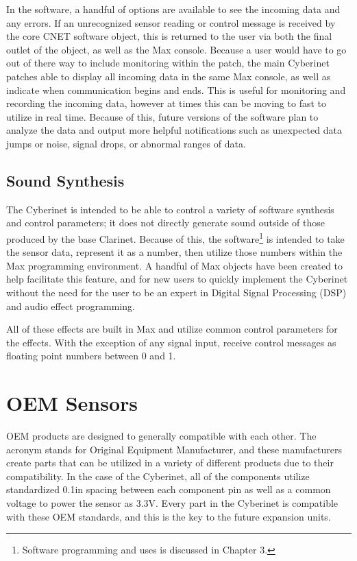 In the software, a handful of options are available to see the incoming data and any errors. If an unrecognized sensor reading or control message is received by the core CNET software object, this is returned to the user via both the final outlet of the object, as well as the Max console. Because a user would have to go out of there way to include monitoring within the patch, the main Cyberinet patches able to display all incoming data in the same Max console, as well as indicate when communication begins and ends. This is useful for monitoring and recording the incoming data, however at times this can be moving to fast to utilize in real time. Because of this, future versions of the software plan to analyze the data and output more helpful notifications such as unexpected data jumps or noise, signal drops, or abnormal ranges of data.

\subsection{Sound Synthesis} %

The Cyberinet is intended to be able to control a variety of software synthesis and control parameters; it does not directly generate sound outside of those produced by the base Clarinet. Because of this, the software\footnote{Software programming and uses is discussed in Chapter 3.} is intended to take the sensor data, represent it as a number, then utilize those numbers within the Max programming environment. A handful of Max objects have been created to help facilitate this feature, and for new users to quickly implement the Cyberinet without the need for the user to be an expert in Digital Signal Processing (DSP) and audio effect programming.

All of these effects are built in Max and utilize common control parameters for the effects. With the exception of any signal input, receive control messages as floating point numbers between 0 and 1.

\section{OEM Sensors}

OEM products are designed to generally compatible with each other. The acronym stands for Original Equipment Manufacturer, and these manufacturers create parts that can be utilized in a variety of different products due to their compatibility. In the case of the Cyberinet, all of the components utilize standardized 0.1in spacing between each component pin as well as a common voltage to power the sensor as 3.3V. Every part in the Cyberinet is compatible with these OEM standards, and this is the key to the future expansion units.

